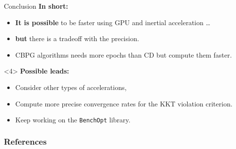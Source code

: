 \documentclass[10pt,aspectratio=43]{beamer}
\begin{document}
\begin{frame}{Conclusion}
\textbf{In short:}
\begin{itemize}
    \item \textbf{It is possible} to be faster using GPU and inertial
    acceleration \dots
    \item<2-> \textbf{but} there is a tradeoff with the precision.
    \item<3-> CBPG algorithms needs more epochs than CD but compute them faster.
\end{itemize}

\medskip
\begin{onlyenv}<4>
\textbf{Possible leads:}
\begin{itemize}
    \item Consider other types of accelerations,
    \item Compute more precise convergence rates for the KKT violation
    criterion.
    \item Keep working on the \texttt{BenchOpt} library.
\end{itemize}
\end{onlyenv}
\end{frame}


\begin{frame}
    \frametitle{References}
    \footnotesize
    \printbibliography
\end{frame}


\begin{frame}
\end{frame}
\end{document}
